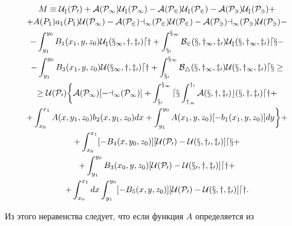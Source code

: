\begin{gather*} 


M\equiv\cal U_z(P_0)+A(P_1)\cal U_z(P_1)- 


A(P_2)\cal U_z(P_2)-A(P_3)\cal U_z(P_3)+\\ 


% 


+A(P_1)a_1(P_1)\cal U(P_1)-A(P_2)a_1(P_2)\cal U(P_2)- 


A(P_3)a_1(P_3)\cal U(P_3)-\\ 


% 


-\int^{y_0}_{y_1}B_1(x_1,y,z_0)\cal U_z(x_1,y,z_0)dy+ 


\int^{x_1}_{x_0}B_2(x,y_1,z_0)\cal U_z(x,y_1,z_0)dx-\\ 


% 


-\int^{y_0}_{y_1}B_3(x_1,y,z_0)\cal U(x_1,y,z_0)dy+ 


\int^{x_1}_{x_0}B_4(x,y_1,z_0)\cal U(x,y_1,z_0)dx\ge \\ 


% 


\ge\cal U(P_0)\bigg\{A(P_1)[-a_1(P_1)]+ 


\int^{x_1}_{x_0}dx\int^{y_0}_{y_1} 


A(x,y,z_0)c(x,y,z_0)dy+ \\ 


% 


+\int^{x_1}_{x_0}A(x,y_1,z_0)b_2(x,y_1,z_0)dx+ 


\int^{y_0}_{y_1}A(x_1,y,z_0)[-b_1(x_1,y,z_0)]dy\bigg\}+ \\ 


% 


+\int^{x_1}_{x_0}[-B_4(x,y_0,z_0)][\cal U(P_0)- 


\cal U(x,y_0,z_0)]dx+ \\ 


% 


+\int^{y_0}_{y_1}B_3(x_0,y,z_0)[\cal U(P_0)- 


\cal U(x_0,y,z_0)]dy+ \\ 


% 


+\int^{x_1}_{x_0}dx\int^{y_0}_{y_1} 


[-B_5(x,y,z_0)][\cal U(P_0)-\cal U(x,y,z_0)]dy.


\end{gather*} 


Из этого неравенства следует, что если функция $A$ определяется из 


